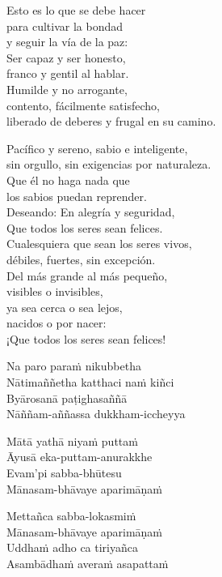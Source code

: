 
\begin{leader}
\end{leader}

Esto es lo que se debe hacer\\
para cultivar la bondad\\
y seguir la vía de la paz:\\
Ser capaz y ser honesto,\\
franco y gentil al hablar.\\
Humilde y no arrogante,\\
contento, fácilmente satisfecho,\\
liberado de deberes y frugal en su camino.

Pacífico y sereno, sabio e inteligente,\\
sin orgullo, sin exigencias por naturaleza.\\
Que él no haga nada que\\
los sabios puedan reprender.\\
Deseando: En alegría y seguridad,\\
Que todos los seres sean felices.\\
Cualesquiera que sean los seres vivos,\\
débiles, fuertes, sin excepción.\\
Del más grande al más pequeño,\\
visibles o invisibles,\\
ya sea cerca o sea lejos,\\
nacidos o por nacer: \\
¡Que todos los seres sean felices!

\clearpage

Na paro paraṁ nikubbetha\\
Nātimaññetha katthaci naṁ kiñci\\
Byārosanā paṭighasaññā\\
Nāññam-aññassa dukkham-iccheyya

Mātā yathā niyaṁ puttaṁ\\
Āyusā eka-puttam-anurakkhe\\
Evam'pi sabba-bhūtesu\\
Mānasam-bhāvaye aparimāṇaṁ

Mettañca sabba-lokasmiṁ\\
Mānasam-bhāvaye aparimāṇaṁ\\
Uddhaṁ adho ca tiriyañca\\
Asambādhaṁ averaṁ asapattaṁ

